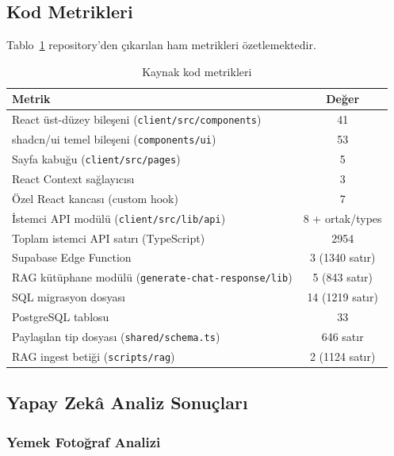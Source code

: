 \subsection{Kod Metrikleri}

Tablo~\ref{tab:code_metrics} repository'den çıkarılan ham metrikleri özetlemektedir.

\begin{table}[H]
\centering
\caption{Kaynak kod metrikleri}
\label{tab:code_metrics}
\begin{tabular}{|l|c|}
\hline
\textbf{Metrik} & \textbf{Değer} \\
\hline
React üst-düzey bileşeni (\texttt{client/src/components})       & 41 \\
shadcn/ui temel bileşeni (\texttt{components/ui})              & 53 \\
Sayfa kabuğu (\texttt{client/src/pages})                       & 5 \\
React Context sağlayıcısı                                     & 3 \\
Özel React kancası (custom hook)                              & 7 \\
İstemci API modülü (\texttt{client/src/lib/api})              & 8 + ortak/types \\
Toplam istemci API satırı (TypeScript)                         & 2954 \\
Supabase Edge Function                                        & 3 (1340 satır) \\
RAG kütüphane modülü (\texttt{generate-chat-response/lib})     & 5 (843 satır) \\
SQL migrasyon dosyası                                         & 14 (1219 satır) \\
PostgreSQL tablosu                                            & 33 \\
Paylaşılan tip dosyası (\texttt{shared/schema.ts})            & 646 satır \\
RAG ingest betiği (\texttt{scripts/rag})                       & 2 (1124 satır) \\
\hline
\end{tabular}
\end{table}

\subsection{Yapay Zekâ Analiz Sonuçları}

\subsubsection{Yemek Fotoğraf Analizi}

